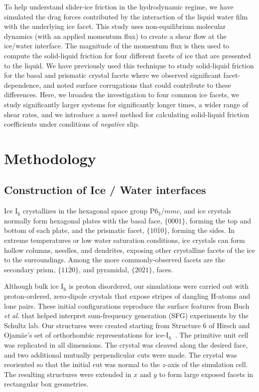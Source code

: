 \documentclass[journal = jpccck, manuscript = article]{achemso}
\begin{document}
To help understand slider-ice friction in the hydrodynamic regime, we
have simulated the drag forces contributed by the interaction of the
liquid water film with the underlying ice facet. This study uses
non-equilibrium molecular dynamics (with an applied momentum flux) to
create a shear flow at the ice/water interface. The magnitude of the
momentum flux is then used to compute the solid-liquid friction for
four different facets of ice that are presented to the liquid.  We
have previously used this technique to study solid-liquid friction for
the basal and prismatic crystal facets where we observed significant
facet-dependence, and noted surface corrugations that could contribute
to these differences.\cite{Louden2013} Here, we broaden the
investigation to four common ice facets, we study significantly larger
systems for significantly longer times, a wider range of shear rates,
and we introduce a novel method for calculating solid-liquid friction
coefficients under conditions of \textit{negative} slip.

\section{Methodology}
\subsection{Construction of Ice / Water interfaces}
Ice I$_\mathrm{h}$ crystallizes in the hexagonal space group
P$6_3/mmc$, and ice crystals normally form hexagonal plates with the
basal face, $\{0001\}$, forming the top and bottom of each plate, and
the prismatic facet, $\{10\bar{1}0\}$, forming the sides.  In extreme
temperatures or low water saturation conditions, ice crystals can form
hollow columns, needles, and dendrites, exposing other crystalline
facets of the ice to the surroundings.  Among the more
commonly-observed facets are the secondary prism, $\{11\bar{2}0\}$,
and pyramidal, $\{20\bar{2}1\}$, faces.

Although bulk ice I$_\mathrm{h}$ is proton disordered, our simulations
were carried out with proton-ordered, zero-dipole crystals that expose
stripes of dangling H-atoms and lone pairs.  These initial
configurations reproduce the surface features from Buch \textit{et
  al.}\cite{Buch2008} that helped interpret sum-frequency generation
(SFG) experiments by the Schultz lab.\cite{Groenzin07} Our structures were
created starting from Structure 6 of Hirsch and Ojam\"{a}e's set of
orthorhombic representations for ice-I$_{h}$~\cite{Hirsch2004}. The
primitive unit cell was replicated in all dimensions. The crystal was
cleaved along the desired face, and two additional mutually
perpendicular cuts were made.  The crystal was reoriented so that the
initial cut was normal to the $z$-axis of the simulation cell.  The
resulting structures were extended in $x$ and $y$ to form large
exposed facets in rectangular box geometries.
\end{document}
